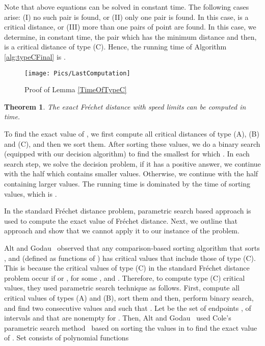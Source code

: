 \documentclass[12pt]{dalthesis}
\def\favoritefont{\bfseries \sffamily}
\def\QED{\ensuremath{{\Box}}}
\def\markatright#1{\leavevmode\unskip\nobreak\quad\hspace*{\fill}{#1}}
\newenvironment{proof}
	{\begin{trivlist}\item[\hskip\labelsep{\favoritefont Proof:}]}
	{\markatright{\QED}\end{trivlist}}
\newtheorem{theorem}{Theorem}
\newcommand{\Frechet}{Fr\'echet }
\begin{document}
\begin{proof}
{}

\vspace{0.2in}
Note that above equations can be solved in constant time. The following 
cases arise: (I) no such pair  is  found, or 
(II) only one pair  is found. In this case,  is a critical distance, or
(III) more than one pairs of point  are found. In this case, we determine, 
in constant time, the pair 
 which has the minimum distance  
and then,  is a critical distance of type (C).
Hence, the running  time of Algorithm \ref{alg:typeCFinal} is .


\end{proof}
 



\begin{figure}[t]
	\centering
	\texttt{[image: Pics/LastComputation]}  
	\caption{Proof of Lemma \ref{TimeOfTypeC}}
	\label{fig:TimeOfTypeC}
\end{figure}








\begin{theorem}
	The exact \Frechet distance with speed limits can be computed in  time.
\end{theorem}
\begin{proof}
To find the exact value of ,
we first compute all  critical distances of type (A), (B) and (C), 
and then we sort them. After sorting these values,
we do a binary search
(equipped with our decision algorithm)
to find the smallest  for which .
In each search step, we solve the 
decision problem, if it has a positive answer, 
we continue with the half which contains 
smaller values. Otherwise, we continue with the half containing larger values.
The running time is dominated by the time of sorting  values, 
which is .
\end{proof}



In the standard \Frechet distance problem, 
parametric search based approach is used to compute the exact value of \Frechet distance. 
Next, we outline that approach and show that we cannot apply it to our instance of the problem.

Alt and Godau~\cite{AltG95} observed that
any comparison-based sorting algorithm that sorts
, and  
(defined as functions of )
has critical values that include those of type (C).
This is because the critical values of type (C) in the
standard \Frechet distance problem occur if 
 or ,
for some , and . 
Therefore, to compute type (C) critical values, 
they   
used parametric search technique as follows.
First, compute all critical values of types (A) and (B), sort them
and then, perform binary search, and find two consecutive values  
 and  such that .
Let  be the set of endpoints ,  of intervals  
 and  that are nonempty for .
Then, Alt and Godau~\cite{AltG95} used Cole's parametric search method~\cite{Cole87}  
based on sorting the values in  
to find the exact value of . 
Set  consists of  polynomial functions 
 
\end{document}
